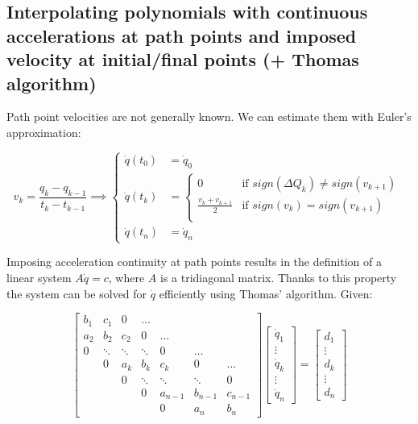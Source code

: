 \newpage

\subsection{Interpolating polynomials with continuous accelerations at path points and imposed velocity at initial/final points (+ Thomas algorithm)}

Path point velocities are not generally known. We can estimate them with Euler's approximation:

\begin{equation*}
v_k = \frac{q_k-q_{k-1}}{t_k-t_{k-1}}\implies\begin{cases}
\dot q(t_0)&=\dot q_0\\
\dot q(t_k)&=\begin{cases}
0 & \text{if }sign(\Delta Q_k)\neq sign(v_{k+1})\\
\frac{v_k+v_{k+1}}{2} &  \text{if }sign(v_k) =  sign(v_{k+1})\\
\end{cases}\\
\dot q(t_n) &= \dot q_n
\end{cases}
\end{equation*}

Imposing acceleration continuity at path points results in the definition of a linear system $A\dot q=c$, where $A$ is a tridiagonal matrix. Thanks to this property the system can be solved for $\dot q$ efficiently using Thomas' algorithm. Given:

\begin{equation*}
\begin{bmatrix}
b_1 & c_1 & 0 & \dots\\
a_2 & b_2 & c_2 & 0 & \dots\\
0 & \ddots & \ddots & \ddots & 0 & \dots\\
& 0 & a_k & b_k & c_k & 0 & \dots\\
& & 0 & \ddots & \ddots & \ddots & 0 \\
& & & 0 & a_{n-1} & b_{n-1} & c_{n-1}\\
& & & & 0 & a_n & b_n
\end{bmatrix}\begin{bmatrix}
\dot q_1\\\vdots\\\dot  q_k\\\vdots \\ \dot q_n
\end{bmatrix}=\begin{bmatrix}
d_1\\\vdots\\ d_k\\\vdots \\ d_n
\end{bmatrix}
\end{equation*}

